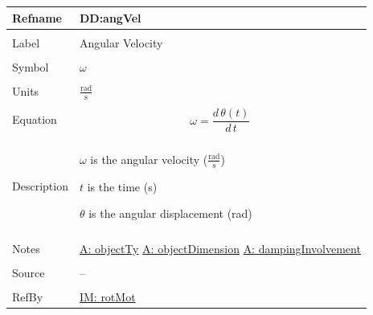 \documentclass[12pt]{article}
\begin{document}
\noindent \begin{minipage}{\textwidth}
\begin{tabular}{p{} p{}}
\toprule \textbf{Refname} & \textbf{DD:angVel}
\label{DD:angVel}
\\ \midrule \\
Label & Angular Velocity
\\ \midrule \\
Symbol & $ω$
\\ \midrule \\
Units & $\frac{\text{rad}}{\text{s}}$
\\ \midrule \\
Equation & \begin{displaymath}
           ω=\frac{d\,θ\left(t\right)}{d\,t}
           \end{displaymath}
\\ \midrule \\
Description & \begin{symbDescription}
              \item{$ω$ is the angular velocity ($\frac{\text{rad}}{\text{s}}$)}
              \item{$t$ is the time (s)}
              \item{$θ$ is the angular displacement (rad)}
              \end{symbDescription}
\\ \midrule \\
Notes & \hyperref[assumpOT]{A: objectTy}
        \hyperref[assumpOD]{A: objectDimension}
        \hyperref[assumpDI]{A: dampingInvolvement}
\\ \midrule \\
Source & --
\\ \midrule \\
RefBy & \hyperref[IM:rotMot]{IM: rotMot}
\\ \bottomrule \end{tabular}
\end{minipage}
\par~
\end{document}
